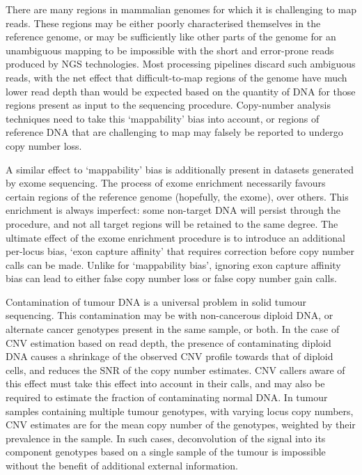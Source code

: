 \documentclass[dissertation.tex]{subfiles}
\begin{document}
There are many regions in mammalian genomes for which it is challenging to map reads.  These regions may be either poorly characterised themselves in the reference genome, or may be sufficiently like other parts of the genome for an unambiguous mapping to be impossible with the short and error-prone reads produced by \gls{NGS} technologies.  Most processing pipelines discard such ambiguous reads, with the net effect that difficult-to-map regions of the genome have much lower read depth than would be expected based on the quantity of DNA for those regions present as input to the sequencing procedure.  Copy-number analysis techniques need to take this `mappability' bias into account, or regions of reference DNA that are challenging to map may falsely be reported to undergo copy number loss.

A similar effect to `mappability' bias is additionally present in datasets generated by exome sequencing.  The process of exome enrichment necessarily favours certain regions of the reference genome (hopefully, the exome), over others.  This enrichment is always imperfect: some non-target DNA will persist through the procedure, and not all target regions will be retained to the same degree.  The ultimate effect of the exome enrichment procedure is to introduce an additional per-locus bias, `exon capture affinity' that requires correction before copy number calls can be made.  Unlike for `mappability bias', ignoring exon capture affinity bias can lead to either false copy number loss or false copy number gain calls.

Contamination of tumour DNA is a universal problem in solid tumour sequencing.  This contamination may be with non-cancerous diploid DNA, or alternate cancer genotypes present in the same sample, or both.  In the case of \gls{CNV} estimation based on read depth, the presence of contaminating diploid DNA causes a shrinkage of the observed \gls{CNV} profile towards that of diploid cells, and reduces the \gls{SNR} of the copy number estimates.  \gls{CNV} callers aware of this effect must take this effect into account in their calls, and may also be required to estimate the fraction of contaminating normal DNA.  In tumour samples containing multiple tumour genotypes, with varying locus copy numbers, \gls{CNV} estimates are for the mean copy number of the genotypes, weighted by their prevalence in the sample.  In such cases, deconvolution of the signal into its component genotypes based on a single sample of the tumour is impossible without the benefit of additional external information.
\end{document}
